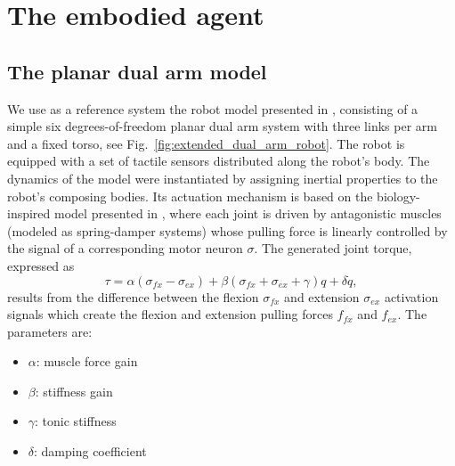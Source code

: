 \section{The embodied agent}

\subsection{The planar dual arm model}
We use as a reference system the robot model presented in \cite{Mannella2018Knowyourbody,Marcel2022Learningreachown}, consisting of a simple six degrees-of-freedom planar dual arm system with three links per arm and a fixed torso, see Fig.~\ref{fig:extended_dual_arm_robot}. The robot is equipped with a set of tactile sensors distributed along the robot's body. The dynamics of the model were instantiated by assigning inertial properties to the robot's composing bodies. Its actuation mechanism is based on the biology-inspired model presented in \cite{Ekeberg1993combinedneuronalmechanical,Wadden1998neuromechanicalmodel, Shim2012Chaoticexplorationlearning}, where each joint is driven by antagonistic muscles (modeled as spring-damper systems) whose pulling force is linearly controlled by the signal of a corresponding motor neuron $\sigma$. The generated joint torque, expressed as
\begin{equation}\label{eq:antagonistic_torque}
	\tau = \alpha \left(\sigma_{fx} - \sigma_{ex}\right)  + \beta \left(\sigma_{fx} + \sigma_{ex} + \gamma \right) q + \delta \dot{q},
\end{equation}
results from the difference between the flexion $ \sigma_{fx} $ and extension $\sigma_{ex}$ activation signals which create the flexion and extension pulling forces $ f_{fx}$ and $f_{ex} $. The parameters are:
\begin{itemize}
	\item $\alpha$: muscle force gain
	\item $\beta$: stiffness gain
	\item $\gamma$: tonic stiffness	
	\item $\delta$: damping coefficient
\end{itemize}

